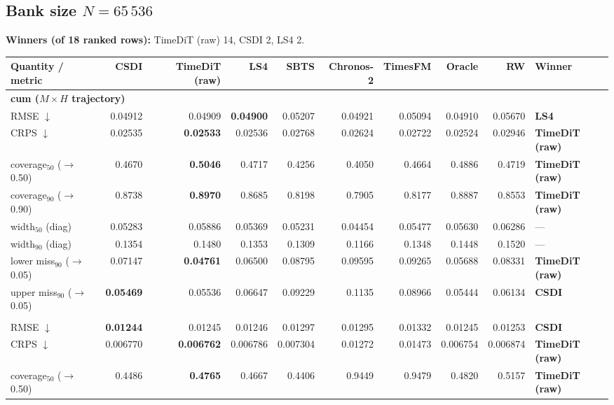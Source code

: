 \documentclass[11pt,a4paper]{article}
\begin{document}
\begin{landscape}
\section*{Bank size $N = 65\,536$}
\noindent\textbf{Winners (of 18 ranked rows):} TimeDiT (raw) 14, CSDI 2, LS4 2.
\begin{center}\small
\begin{tabular}{lrrrrrrrrl}
\toprule
Quantity / metric & CSDI & TimeDiT (raw) & LS4 & SBTS & Chronos-2 & TimesFM & Oracle & RW & Winner \\
\midrule
\multicolumn{10}{l}{\textbf{cum ($M\times H$ trajectory)}} \\
RMSE $\downarrow$ & 0.04912 & 0.04909 & \textbf{0.04900} & 0.05207 & 0.04921 & 0.05094 & 0.04910 & 0.05670 & \textbf{LS4} \\
CRPS $\downarrow$ & 0.02535 & \textbf{0.02533} & 0.02536 & 0.02768 & 0.02624 & 0.02722 & 0.02524 & 0.02946 & \textbf{TimeDiT (raw)} \\
coverage$_{50}$ ($\to$0.50) & 0.4670 & \textbf{0.5046} & 0.4717 & 0.4256 & 0.4050 & 0.4664 & 0.4886 & 0.4719 & \textbf{TimeDiT (raw)} \\
coverage$_{90}$ ($\to$0.90) & 0.8738 & \textbf{0.8970} & 0.8685 & 0.8198 & 0.7905 & 0.8177 & 0.8887 & 0.8553 & \textbf{TimeDiT (raw)} \\
width$_{50}$ (diag) & 0.05283 & 0.05886 & 0.05369 & 0.05231 & 0.04454 & 0.05477 & 0.05630 & 0.06286 & --- \\
width$_{90}$ (diag) & 0.1354 & 0.1480 & 0.1353 & 0.1309 & 0.1166 & 0.1348 & 0.1448 & 0.1520 & --- \\
lower miss$_{90}$ ($\to$0.05) & 0.07147 & \textbf{0.04761} & 0.06500 & 0.08795 & 0.09595 & 0.09265 & 0.05688 & 0.08331 & \textbf{TimeDiT (raw)} \\
upper miss$_{90}$ ($\to$0.05) & \textbf{0.05469} & 0.05536 & 0.06647 & 0.09229 & 0.1135 & 0.08966 & 0.05444 & 0.06134 & \textbf{CSDI} \\
\addlinespace
\multicolumn{10}{l}{\textbf{step ($M\times H$)}} \\
RMSE $\downarrow$ & \textbf{0.01244} & 0.01245 & 0.01246 & 0.01297 & 0.01295 & 0.01332 & 0.01245 & 0.01253 & \textbf{CSDI} \\
CRPS $\downarrow$ & 0.006770 & \textbf{0.006762} & 0.006786 & 0.007304 & 0.01272 & 0.01473 & 0.006754 & 0.006874 & \textbf{TimeDiT (raw)} \\
coverage$_{50}$ ($\to$0.50) & 0.4486 & \textbf{0.4765} & 0.4667 & 0.4406 & 0.9449 & 0.9479 & 0.4820 & 0.5157 & \textbf{TimeDiT (raw)} \\

\end{tabular}
\end{center}
\end{landscape}
\end{document}
